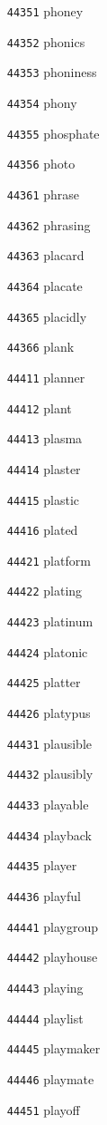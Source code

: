 \documentclass[twoside,11pt]{article}
\begin{document}
\begin{multicols}{5}
\begin{enumerate}
\item[\texttt{44351}] phoney
\item[\texttt{44352}] phonics
\item[\texttt{44353}] phoniness
\item[\texttt{44354}] phony
\item[\texttt{44355}] phosphate
\item[\texttt{44356}] photo
\item[\texttt{44361}] phrase
\item[\texttt{44362}] phrasing
\item[\texttt{44363}] placard
\item[\texttt{44364}] placate
\item[\texttt{44365}] placidly
\item[\texttt{44366}] plank
\item[\texttt{44411}] planner
\item[\texttt{44412}] plant
\item[\texttt{44413}] plasma
\item[\texttt{44414}] plaster
\item[\texttt{44415}] plastic
\item[\texttt{44416}] plated
\item[\texttt{44421}] platform
\item[\texttt{44422}] plating
\item[\texttt{44423}] platinum
\item[\texttt{44424}] platonic
\item[\texttt{44425}] platter
\item[\texttt{44426}] platypus
\item[\texttt{44431}] plausible
\item[\texttt{44432}] plausibly
\item[\texttt{44433}] playable
\item[\texttt{44434}] playback
\item[\texttt{44435}] player
\item[\texttt{44436}] playful
\item[\texttt{44441}] playgroup
\item[\texttt{44442}] playhouse
\item[\texttt{44443}] playing
\item[\texttt{44444}] playlist
\item[\texttt{44445}] playmaker
\item[\texttt{44446}] playmate
\item[\texttt{44451}] playoff

\end{enumerate}
\end{multicols}
\end{document}
